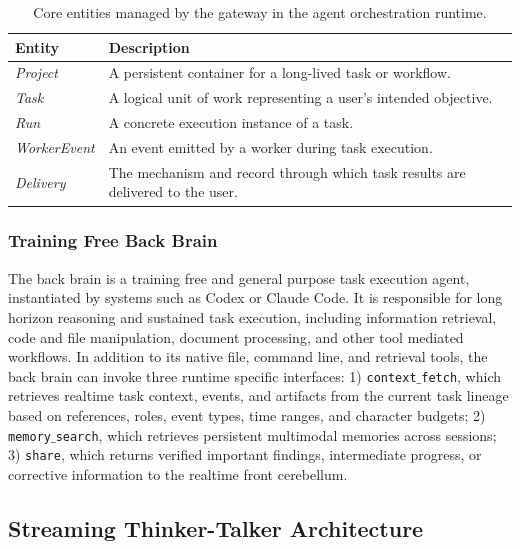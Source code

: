\begin{table}[t]
\centering
\caption{Core entities managed by the gateway in the agent orchestration runtime.}
\label{tab:runtime_entities}
\begin{tabular}{ll}
\toprule
\textbf{Entity} & \textbf{Description} \\
\midrule
\textit{Project} & A persistent container for a long-lived task or workflow. \\
\textit{Task} & A logical unit of work representing a user's intended objective. \\
\textit{Run} & A concrete execution instance of a task. \\
\textit{WorkerEvent} & An event emitted by a worker during task execution. \\
\textit{Delivery} & The mechanism and record through which task results are delivered to the user. \\
\bottomrule
\end{tabular}
\end{table}



\subsubsection{Training Free Back Brain}


The back brain is a training free and general purpose task execution agent, instantiated by systems such as Codex or Claude Code. It is responsible for long horizon reasoning and sustained task execution, including information retrieval, code and file manipulation, document processing, and other tool mediated workflows. In addition to its native file, command line, and retrieval tools, the back brain can invoke three runtime specific interfaces: 1) \texttt{context$\_$fetch}, which retrieves realtime task context, events, and artifacts from the current task lineage based on references, roles, event types, time ranges, and character budgets; 2) \texttt{memory$\_$search}, which retrieves persistent multimodal memories across sessions; 3) \texttt{share}, which returns verified important findings, intermediate progress, or corrective information to the realtime front cerebellum.


\subsection{Streaming Thinker-Talker Architecture} \label{subsec:task-construction}

